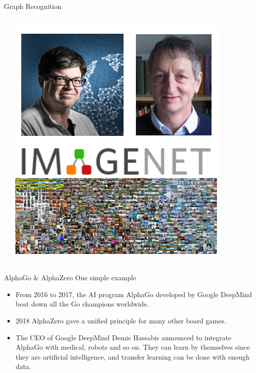 \documentclass{beamer}
\begin{document}
\begin{CJK*}{UTF8}{gbsn}
\begin{frame}{Graph Recognition}
\begin{columns}
\begin{column}{0.4\textwidth}
\centering  
\includegraphics[width=\textwidth]{figures/ImageNet}  \\
\end{column}

\end{columns}
\end{frame}



\begin{frame}{AlphaGo $\&$ AlphaZero}
One simple example
\begin{itemize}
	\item From 2016 to 2017, the AI program AlphaGo developed by Google DeepMind beat down all the Go champions worldwide. 

    \item 2018 AlphaZero gave a unified principle for many other board games.
    \item The CEO of Google DeepMind Demis Hassabis announced to integrate AlphaGo with medical, robots and so on. They can learn by themselves since they are artificial intelligence, and transfer learning can be done with enough data.
\end{itemize}


\end{frame}
\end{CJK*}
\end{document}
